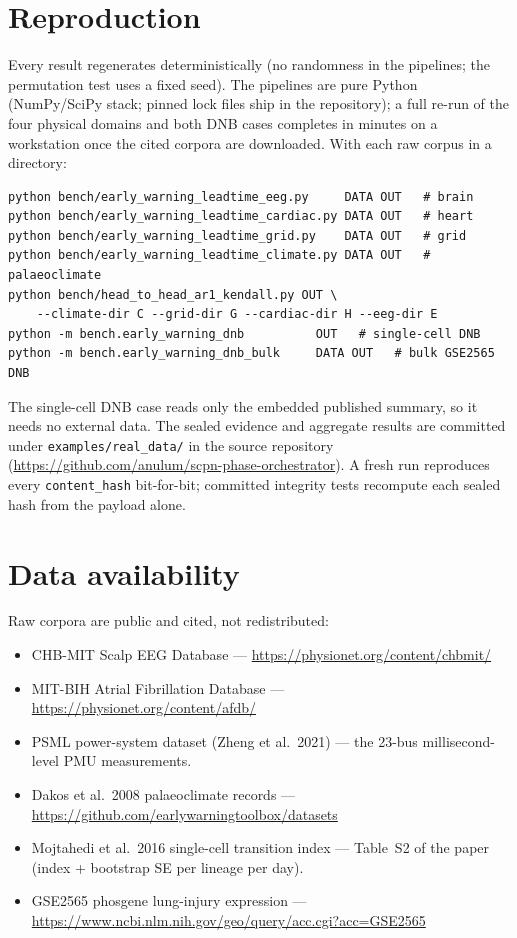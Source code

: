 \documentclass[11pt]{article}
\newcommand{\code}[1]{\texttt{#1}}
\begin{document}
\section{Reproduction}\label{sec:reproduction}

Every result regenerates deterministically (no randomness in the
pipelines; the permutation test uses a fixed seed). The pipelines are
pure Python (NumPy/SciPy stack; pinned lock files ship in the
repository); a full re-run of the four physical domains and both DNB
cases completes in minutes on a workstation once the cited corpora are
downloaded. With each raw corpus in a directory:

\begin{verbatim}
python bench/early_warning_leadtime_eeg.py     DATA OUT   # brain
python bench/early_warning_leadtime_cardiac.py DATA OUT   # heart
python bench/early_warning_leadtime_grid.py    DATA OUT   # grid
python bench/early_warning_leadtime_climate.py DATA OUT   # palaeoclimate
python bench/head_to_head_ar1_kendall.py OUT \
    --climate-dir C --grid-dir G --cardiac-dir H --eeg-dir E
python -m bench.early_warning_dnb          OUT   # single-cell DNB
python -m bench.early_warning_dnb_bulk     DATA OUT   # bulk GSE2565 DNB
\end{verbatim}

The single-cell DNB case reads only the embedded published summary, so
it needs no external data. The sealed evidence and aggregate results
are committed under \code{examples/real\_data/} in the source
repository (\url{https://github.com/anulum/scpn-phase-orchestrator}). A
fresh run reproduces every \code{content\_hash} bit-for-bit; committed
integrity tests recompute each sealed hash from the payload alone.

\section{Data availability}\label{sec:data}

Raw corpora are public and cited, not redistributed:

\begin{itemize}
  \item CHB-MIT Scalp EEG Database ---
    \url{https://physionet.org/content/chbmit/}
  \item MIT-BIH Atrial Fibrillation Database ---
    \url{https://physionet.org/content/afdb/}
  \item PSML power-system dataset (Zheng et al.\ 2021) --- the 23-bus
    millisecond-level PMU measurements.
  \item Dakos et al.\ 2008 palaeoclimate records ---
    \url{https://github.com/earlywarningtoolbox/datasets}
  \item Mojtahedi et al.\ 2016 single-cell transition index ---
    Table~S2 of the paper (index + bootstrap SE per lineage per day).
  \item GSE2565 phosgene lung-injury expression ---
    \url{https://www.ncbi.nlm.nih.gov/geo/query/acc.cgi?acc=GSE2565}
\end{itemize}
\end{document}
